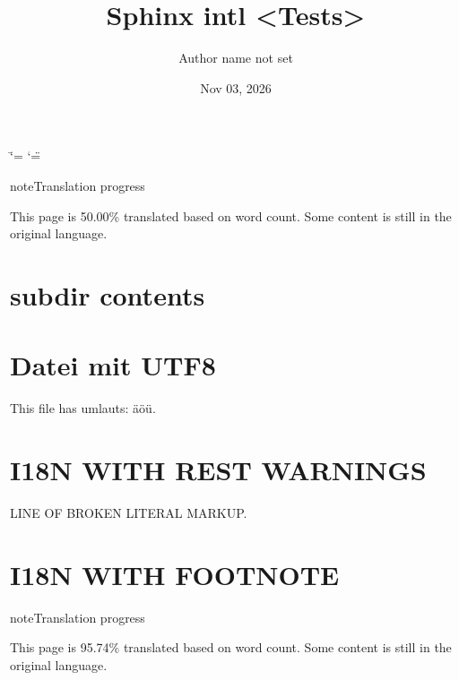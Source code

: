 \documentclass[letterpaper,10pt,english]{sphinxmanual}
\title{Sphinx intl \textless{}Tests\textgreater{}}
\date{Nov 03, 2026}
\author{Author name not set}
\begin{document}
\ifdefined\shorthandoff
  \ifnum\catcode`\=\string=\active\shorthandoff{=}\fi
  \ifnum\catcode`\"=\active{}\fi
\fi

\pagestyle{empty}
\sphinxmaketitle
\pagestyle{plain}
\sphinxtableofcontents
\pagestyle{normal}
\label{\detokenize{index::doc}}


\begin{sphinxadmonition}{note}{Translation progress}

\sphinxAtStartPar
This page is 50.00\% translated based on word count. Some content is still in the original language.
\end{sphinxadmonition}

\sphinxstepscope


\chapter{subdir contents}
\label{\detokenize{subdir/index:subdir-contents}}\label{\detokenize{subdir/index::doc}}
\sphinxstepscope


\chapter{Datei mit UTF\sphinxhyphen{}8}
\label{\detokenize{bom:file-with-utf-8-bom}}\label{\detokenize{bom::doc}}
\sphinxAtStartPar
This file has umlauts: äöü.

\sphinxstepscope


\chapter{I18N WITH REST WARNINGS}
\label{\detokenize{warnings:i18n-with-rest-warnings}}\label{\detokenize{warnings::doc}}
\sphinxAtStartPar
LINE OF {\color{red}\bfseries{}\textasciigrave{}\textasciigrave{}}BROKEN LITERAL MARKUP.

\sphinxstepscope


\chapter{I18N WITH FOOTNOTE}
\label{\detokenize{footnote:i18n-with-footnote}}\label{\detokenize{footnote::doc}}
\begin{sphinxadmonition}{note}{Translation progress}

\sphinxAtStartPar
This page is 95.74\% translated based on word count. Some content is still in the original language.
\end{sphinxadmonition}
\end{document}
